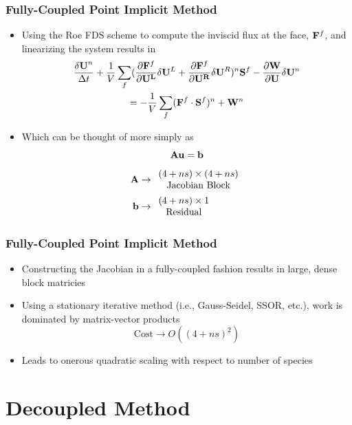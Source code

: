 \documentclass{beamer}
\begin{document}
\begin{frame}
  \frametitle{Fully-Coupled Point Implicit Method}
  \begin{itemize}
  \item Using the Roe FDS scheme to compute the inviscid flux at the face,
    ${\bf F}^f$, and linearizing the system results in
  \begin{multline*}
  	\frac{\mathbf{\delta U}^n}{\Delta t}
    +\frac{1}{V}\sum\limits_{f}(\frac{\partial {\bf F}^f}
    {\partial \mathbf{U^L}}\delta{\bf U}^L
  	+\frac{\partial {\bf F}^f}{\partial \mathbf{U^R}}\delta{\bf U}^R)^n {\bf S}^f
  	- \frac{\partial {\bf W}}{\partial {\bf U}}\delta{\bf U}^n \\
  	= -\frac{1}{V}\sum\limits_{f}({\bf F}^f\cdot{\bf S}^f)^n + {\bf W}^n
  \end {multline*}
  \item Which can be thought of more simply as
  \[
    {\bf A}{\bf u} = {\bf b}
  \]
  \begin{align*}
    {\bf A} &\to
    \begin{array}{c}
      (4+ns) \times (4+ns) \\
      \text{Jacobian Block}
    \end{array} \\
    {\bf b} &\to
    \begin{array}{c}
      (4+ns) \times 1 \\
      \text{Residual}
    \end{array}
  \end{align*}
  \end{itemize}
\end{frame}
\begin{frame}
  \frametitle{Fully-Coupled Point Implicit Method}
  \begin{itemize}
    \item Constructing the Jacobian in a fully-coupled fashion results in large,
      dense block matricies
    \item Using a stationary iterative method (i.e., Gauss-Seidel, SSOR, etc.),
      work is dominated by matrix-vector products
      \[
        \text{Cost} \to O((4+ns)^2)
      \]
    \item Leads to onerous quadratic scaling with respect to number of species
  \end{itemize}
\end{frame}

\section{Decoupled Method}
\end{document}
